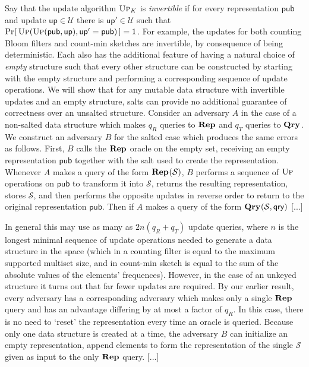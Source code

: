 Say that the update algorithm $\textsc{Up}_K$ is {\em invertible} if for every representation $\mathsf{pub}$ and update $\mathsf{up} \in \mathcal{U}$ there is $\mathsf{up}' \in \mathcal{U}$ such that $\Pr\hspace{-1pt}\left[\,\textsc{Up}(\textsc{Up}(\mathsf{pub},\mathsf{up}),\mathsf{up}' = \mathsf{pub})\,\right] = 1$.  For example, the updates for both counting Bloom filters and count-min sketches are invertible, by consequence of being deterministic. Each also has the additional feature of having a natural choice of {\em empty} structure such that every other structure can be constructed by starting with the empty structure and performing a corresponding sequence of update operations.
We will show that for any mutable data structure with invertible updates and an empty structure, salts can provide no additional guarantee of correctness over an unsalted structure.  Consider an adversary $A$ in the case of a non-salted data structure which makes $q_R$ queries to $\mathbf{Rep}\hspace{0.5pt}$ and $q_T$ queries to $\mathbf{Qry}\hspace{0.5pt}$. We construct an adversary $B$ for the salted case which produces the same errors as follows. First, $B$ calls the $\mathbf{Rep}\hspace{0.5pt}$ oracle on the empty set, receiving an empty representation $\mathsf{pub}$ together with the salt used to create the representation. Whenever $A$ makes a query of the form $\mathbf{Rep}\hspace{0.5pt}(\mathcal{S})$, $B$ performs a sequence of $\textsc{Up}$ operations on $\mathsf{pub}$ to transform it into $\mathcal{S}$, returns the resulting representation, stores $\mathcal{S}$, and then performs the opposite updates in reverse order to return to the original representation $\mathsf{pub}$. Then if $A$ makes a query of the form $\mathbf{Qry}\hspace{0.5pt}(\mathcal{S},\mathsf{qry})$ [...]

In general this may use as many as $2n(q_R+q_T)$ update queries, where $n$ is the longest minimal sequence of update operations needed to generate a data structure in the space (which in a counting filter is equal to the maximum supported multiset size, and in count-min sketch is equal to the sum of the absolute values of the elements' frequences). However, in the case of an unkeyed structure it turns out that far fewer updates are required. By our earlier result, every adversary has a corresponding adversary which makes only a single $\mathbf{Rep}\hspace{0.5pt}$ query and has an advantage differing by at most a factor of $q_R$. In this case, there is no need to `reset' the representation every time an oracle is queried. Because only one data structure is created at a time, the adversary $B$ can initialize an empty representation, append elements to form the representation of the single $\mathcal{S}$ given as input to the only $\mathbf{Rep}\hspace{0.5pt}$ query. [...]

